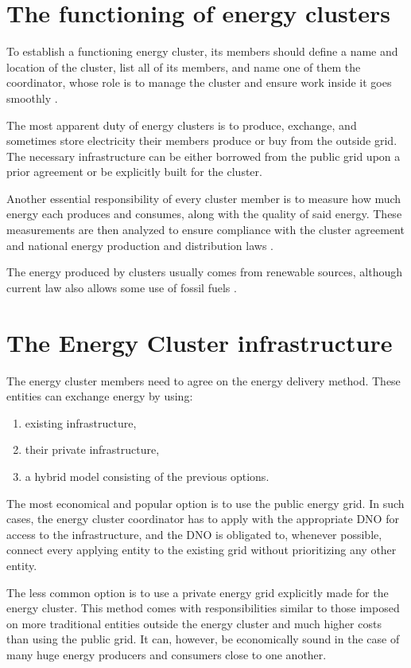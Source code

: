 \section{The functioning of energy clusters}

\par To establish a functioning energy cluster, its members should define a name and location of the cluster, list all of its members, and name one of them the coordinator, whose role is to manage the cluster and ensure work inside it goes smoothly \citep{erKlaster}.
\par The most apparent duty of energy clusters is to produce, exchange, and sometimes store electricity their members produce or buy from the outside grid. The necessary infrastructure can be either borrowed from the public grid upon a prior agreement or be explicitly built for the cluster.
\par Another essential responsibility of every cluster member is to measure how much energy each produces and consumes, along with the quality of said energy. These measurements are then analyzed to ensure compliance with the cluster agreement and national energy production and distribution laws \citep{erKlaster}.
\par The energy produced by clusters usually comes from renewable sources, although current law also allows some use of fossil fuels \citep{UwarunkowaniaRozwojuEnergetykiRozproszonej}.

\section{The Energy Cluster infrastructure}

\par The energy cluster members need to agree on the energy delivery method. These entities can exchange energy by using: 
\begin{enumerate}
  \item existing infrastructure,
  \item their private infrastructure, 
  \item a hybrid model consisting of the previous options.
\end{enumerate}
\par The most economical and popular option is to use the public energy grid. In such cases, the energy cluster coordinator has to apply with the appropriate DNO for access to the infrastructure, and the DNO is obligated to, whenever possible, connect every applying entity to the existing grid without prioritizing any other entity.
\par The less common option is to use a private energy grid explicitly made for the energy cluster. This method comes with responsibilities similar to those imposed on more traditional entities outside the energy cluster and much higher costs than using the public grid. It can, however, be economically sound in the case of many huge energy producers and consumers close to one another.

